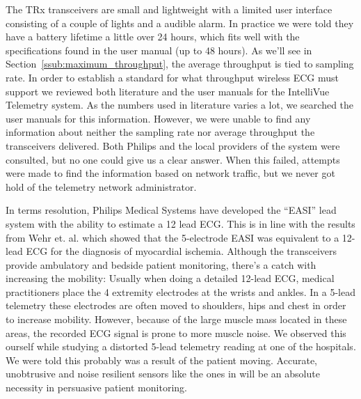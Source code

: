 The TRx transceivers are small and lightweight with a limited user interface consisting of a couple of lights and a audible alarm. In practice we were told they have a battery lifetime a little over 24 hours, which fits well with the specifications found in the user manual (up to 48 hours). As we'll see in Section~\ref{ssub:maximum_throughput}, the average throughput is tied to sampling rate. In order to establish a standard for what throughput wireless ECG must support we reviewed both literature and the user manuals for the IntelliVue Telemetry system. As the numbers used in literature varies a lot, we searched the user manuals for this information. However, we were unable to find any information about neither the sampling rate nor average throughput the transceivers delivered. Both Philips and the local providers of the system were consulted, but no one could give us a clear answer. When this failed, attempts were made to find the information based on network traffic, but we never got hold of the telemetry network administrator.

In terms resolution, Philips Medical Systems have developed the ``EASI'' lead system with the ability to estimate a 12 lead ECG. This is in line with the results from \cite{Wehr:2006ht} Wehr et. al. which showed that the 5-electrode EASI was equivalent to a 12-lead ECG for the diagnosis of myocardial ischemia. Although the transceivers provide ambulatory and bedside patient monitoring, there's a catch with increasing the mobility: Usually when doing a detailed 12-lead ECG, medical practitioners place the 4 extremity electrodes at the wrists and ankles. In a 5-lead telemetry these electrodes are often moved to shoulders, hips and chest in order to increase mobility. However, because of the large muscle mass located in these areas, the recorded ECG signal is prone to more muscle noise. We observed this ourself while studying a distorted 5-lead telemetry reading at one of the hospitals. We were told this probably was a result of the patient moving. Accurate, unobtrusive and noise resilient sensors like the ones in \cite{ChulsungPark:2006tf, Anonymous:FtVb5yQr} will be an absolute necessity in persuasive patient monitoring. 

